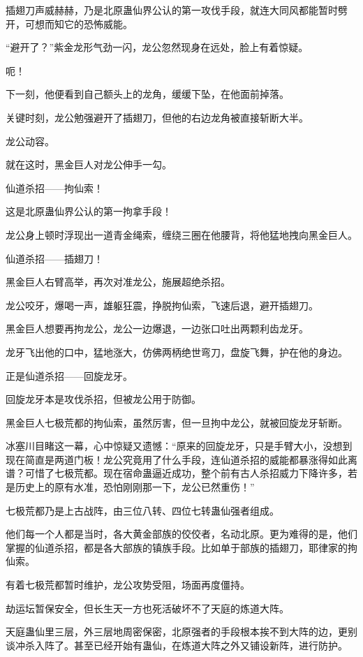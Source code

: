 
\begin{this_body}

插翅刀声威赫赫，乃是北原蛊仙界公认的第一攻伐手段，就连大同风都能暂时劈开，可想而知它的恐怖威能。

“避开了？”紫金龙形气劲一闪，龙公忽然现身在远处，脸上有着惊疑。

呃！

下一刻，他便看到自己额头上的龙角，缓缓下坠，在他面前掉落。

关键时刻，龙公勉强避开了插翅刀，但他的右边龙角被直接斩断大半。

龙公动容。

就在这时，黑金巨人对龙公伸手一勾。

仙道杀招——拘仙索！

这是北原蛊仙界公认的第一拘拿手段！

龙公身上顿时浮现出一道青金绳索，缠绕三圈在他腰背，将他猛地拽向黑金巨人。

仙道杀招——插翅刀！

黑金巨人右臂高举，再次对准龙公，施展超绝杀招。

龙公咬牙，爆喝一声，雄躯狂震，挣脱拘仙索，飞速后退，避开插翅刀。

黑金巨人想要再拘龙公，龙公一边爆退，一边张口吐出两颗利齿龙牙。

龙牙飞出他的口中，猛地涨大，仿佛两柄绝世弯刀，盘旋飞舞，护在他的身边。

正是仙道杀招——回旋龙牙。

回旋龙牙本是攻伐杀招，但被龙公用于防御。

黑金巨人七极荒都的拘仙索，虽然厉害，但一旦拘中龙公，就被回旋龙牙斩断。

冰塞川目睹这一幕，心中惊疑又遗憾：“原来的回旋龙牙，只是手臂大小，没想到现在简直是两道门板！龙公究竟用了什么手段，连仙道杀招的威能都暴涨得如此离谱？可惜了七极荒都。现在宿命蛊逼近成功，整个前有古人杀招威力下降许多，若是历史上的原有水准，恐怕刚刚那一下，龙公已然重伤！”

七极荒都乃是上古战阵，由三位八转、四位七转蛊仙强者组成。

他们每一个人都是当时，各大黄金部族的佼佼者，名动北原。更为难得的是，他们掌握的仙道杀招，都是各大部族的镇族手段。比如单于部族的插翅刀，耶律家的拘仙索。

有着七极荒都暂时维护，龙公攻势受阻，场面再度僵持。

劫运坛暂保安全，但长生天一方也死活破坏不了天庭的炼道大阵。

天庭蛊仙里三层，外三层地周密保密，北原强者的手段根本挨不到大阵的边，更别谈冲杀入阵了。甚至已经开始有蛊仙，在炼道大阵之外又铺设新阵，进行防护。


\end{this_body}
